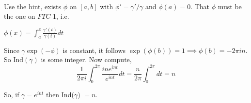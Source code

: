 \documentclass{article}
\begin{document}
Use the hint, exists $\phi$ on $[a,b]$ with $\phi' = \gamma'/\gamma$
and $\phi(a) = 0$. That $\phi$ must be the one on $FTC$ 1, i.e.

$\phi(x) =\int_a^x \frac{\gamma'(t)}{\gamma(t)} dt$

Since $\gamma\exp(-\phi)$ is constant, it follows $\exp(\phi(b)) =
1\implies \phi(b) = -2\pi in$. So $\text{Ind}(\gamma)$ is some
integer. Now compute,
\[\frac{1}{2\pi i}\int_0^{2\pi} \frac{ine^{int}}{e^{int}} dt  =
  \frac{n}{2\pi }\int_0^{2\pi} dt = n\]

So, if $\gamma = e^{int}$ then  Ind($\gamma$) $= n$.
\end{document}

